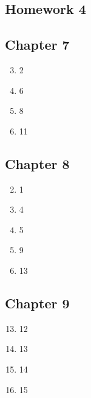 \documentclass{article}
\begin{document}
\begin{center}
    \section*{Homework 4}
\end{center}

\subsection*{Chapter 7}
\begin{enumerate}
\setcounter{enumi}{2}
\item 2
\setcounter{enumi}{6}
\item 6
\setcounter{enumi}{8}
\item 8
\setcounter{enumi}{11}
\item 11
\end{enumerate}

\subsection*{Chapter 8}
\begin{enumerate}
\setcounter{enumi}{1}
\item 1
\setcounter{enumi}{4}
\item 4
\setcounter{enumi}{5}
\item 5
\setcounter{enumi}{9}
\item 9
\setcounter{enumi}{13}
\item 13
\end{enumerate}

\subsection*{Chapter 9}
\begin{enumerate}
\setcounter{enumi}{12}
\item 12
\setcounter{enumi}{13}
\item 13
\setcounter{enumi}{14}
\item 14
\setcounter{enumi}{15}
\item 15
\end{enumerate}
\end{document}
